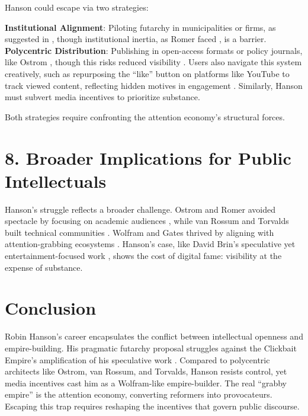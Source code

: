 \documentclass[12pt]{article}
\begin{document}
Hanson could escape via two strategies:

\textbf{Institutional Alignment}: Piloting futarchy in municipalities or firms, as suggested in \citep{econtalk2007}, though institutional inertia, as Romer faced \citep{romer2010}, is a barrier. \\
\textbf{Polycentric Distribution}: Publishing in open-access formats or policy journals, like Ostrom \citep{ostrom1990}, though this risks reduced visibility \citep{hanson2009}. Users also navigate this system creatively, such as repurposing the ``like'' button on platforms like YouTube to track viewed content, reflecting hidden motives in engagement \citep{hanson2009}. Similarly, Hanson must subvert media incentives to prioritize substance.

Both strategies require confronting the attention economy’s structural forces.

\section*{8. Broader Implications for Public Intellectuals}

Hanson’s struggle reflects a broader challenge. Ostrom and Romer avoided spectacle by focusing on academic audiences \citep{ostrom1990,romer2010}, while van Rossum and Torvalds built technical communities \citep{vanrossum1991,torvalds1999}. Wolfram and Gates thrived by aligning with attention-grabbing ecosystems \citep{wolfram2002,gates1995}. Hanson’s case, like David Brin’s speculative yet entertainment-focused work \citep{brin1998}, shows the cost of digital fame: visibility at the expense of substance.

\section*{Conclusion}

Robin Hanson’s career encapsulates the conflict between intellectual openness and empire-building. His pragmatic futarchy proposal \citep{hanson2001} struggles against the Clickbait Empire’s amplification of his speculative work \citep{hanson2021,bbc2021}. Compared to polycentric architects like Ostrom, van Rossum, and Torvalds, Hanson resists control, yet media incentives cast him as a Wolfram-like empire-builder. The real ``grabby empire'' is the attention economy, converting reformers into provocateurs. Escaping this trap requires reshaping the incentives that govern public discourse.



\end{document}
